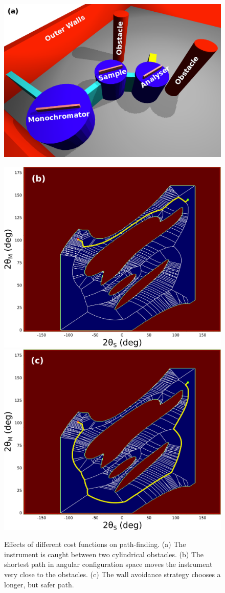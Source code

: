 \begin{figure}[h]
	\begin{center}
		\includegraphics[width = 0.66 \textwidth]{figures/strategies_instrument}

		\vspace{0.1cm}
		\includegraphics[width = 0.49 \textwidth]{figures/strategies_shortest_path}
		\hspace{0.1cm}
		\includegraphics[width = 0.49 \textwidth]{figures/strategies_avoid_walls}
	\end{center}
	\caption[Path-finding strategies.]{
		Effects of different cost functions on path-finding.
		(a) The instrument is caught between two cylindrical obstacles.
		(b) The shortest path in angular configuration space moves the instrument very close to the obstacles.
		(c) The wall avoidance strategy chooses a longer, but safer path.
		\label{fig:path_finding_strategies}}
\end{figure}


